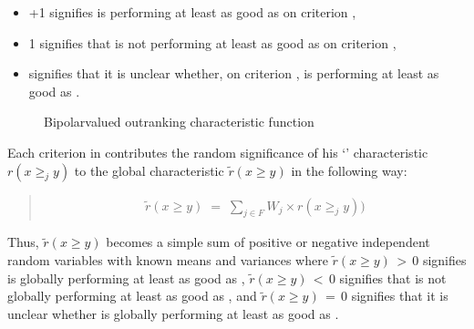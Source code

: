 \documentclass[a4paper,12pt,english]{sphinxhowto}
\let\sphinxpxdimen\pdfpxdimen\else\newdimen\sphinxpxdimen
\begin{document}
\begin{description}
\begin{itemize}
\item {} 
\sphinxAtStartPar
+1 signifies  is performing at least as good as  on
criterion ,

\item {} 
\sphinxAtStartPar
\sphinxhyphen{}1 signifies that  is not performing at least as good as  on
criterion ,

\item {} 
 signifies that it is
unclear whether, on criterion ,  is performing at least as good as .

\end{itemize}

\end{description}

\begin{figure}[H]
\centering
\capstart

\noindent\sphinxincludegraphics[width=450\sphinxpxdimen]{{rCharacteristic}.png}
\caption{Bipolar\sphinxhyphen{}valued outranking characteristic function}\label{\detokenize{pearls:rcharacteristic}}\end{figure}

\sphinxAtStartPar
Each criterion  in  contributes the random significance  of his ‘’ characteristic \(r(x \geq_j y)\) to the global characteristic \(\tilde{r}(x \geq y)\) in the following way:
\begin{quote}
\begin{equation*}
\begin{split}\tilde{r}(x \geq y) \; = \; \sum_{j \in F} W_j \times r(x \geq_j y) )\end{split}
\end{equation*}\end{quote}

\sphinxAtStartPar
Thus, \(\tilde{r}(x \geq y)\) becomes a simple sum of positive or negative independent random variables with known means and variances where \(\tilde{r}(x \geq y) \, > \, 0\) signifies  is globally performing at least as good as , \(\tilde{r}(x \geq y) \, < \, 0\) signifies that  is not globally performing at least as good as , and \(\tilde{r}(x \geq y)\,=\,0\) signifies that it is unclear whether  is globally performing at least as good as .
\end{document}
